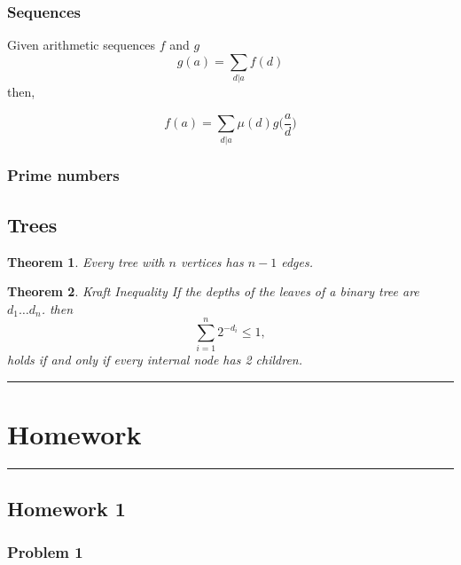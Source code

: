 \documentclass[10pt,a4paper,titlepage,twoside,draft]{article}
\theoremstyle{plain}
\newtheorem{thm}{Theorem}
\theoremstyle{definition}
\theoremstyle{remark}
\begin{document}
\subsubsection{Sequences}
Given arithmetic sequences $f$ and $g$
\[g(a) = \sum_{d \vert a} f(d)\]
then,

\[f(a) = \sum_{d \vert a} \mu(d) g \bigg( \frac{a}{d} \bigg) \]


\subsubsection{Prime numbers}





\subsection{Trees}

\begin{thm}
Every tree with $n$ vertices has $n-1$ edges.
\end{thm}


\medskip

\begin{thm}{Kraft Inequality}
If the depths of the leaves of a binary tree are $d_{1}
\ldots d_{n}$. then 
\[
\sum_{i=1}^n 2^{- d_i} \leq 1,
\]
holds if and only if every internal node has 2 children.
\end{thm}

\pagebreak

\hrule
\section{Homework}
\hrule
\vfill
\pagebreak

\subsection{Homework 1}

\subsubsection{Problem 1}
\end{document}
